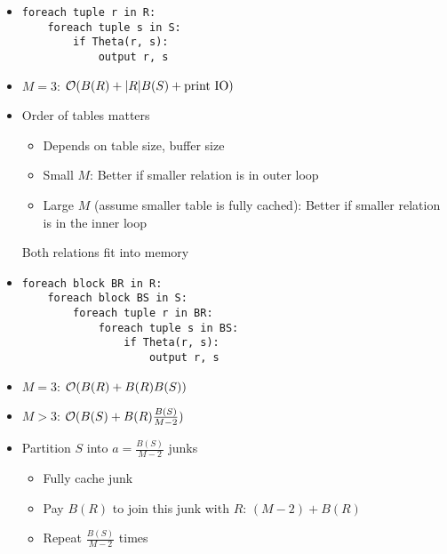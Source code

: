 \begin{itemize}
\begin{itemize}
\begin{itemize}
                    \item
\begin{verbatim}
foreach tuple r in R:
    foreach tuple s in S:
        if Theta(r, s):
            output r, s
\end{verbatim}
                    \item $M = 3$: $\mathcal{O}(B(R) + |R| B(S) + \text{print IO})$
                    \item Order of tables matters
                        \begin{itemize}
                            \item Depends on table size, buffer size
                            \item Small $M$: Better if smaller relation is in outer loop
                            \item Large $M$ (assume smaller table is fully cached): Better if smaller relation is in the inner loop
                        \end{itemize}
                     Both relations fit into memory
                \end{itemize}
                \begin{itemize}
                    \item
\begin{verbatim}
foreach block BR in R:
    foreach block BS in S:
        foreach tuple r in BR:
            foreach tuple s in BS:
                if Theta(r, s):
                    output r, s
\end{verbatim}
                    \item $M = 3$: $\mathcal{O}(B(R) + B(R) B(S))$
                    \item $M > 3$: $\mathcal{O}(B(S) + B(R) \frac{B(S)}{M - 2})$
                    \item Partition $S$ into $a = \frac{B(S)}{M - 2}$ junks
                        \begin{itemize}
                            \item Fully cache junk
                            \item Pay $B(R)$ to join this junk with $R$: $(M - 2) + B(R)$
                            \item Repeat $\frac{B(S)}{M - 2}$ times 
                        \end{itemize}
                \end{itemize}

\end{itemize}
\end{itemize}
